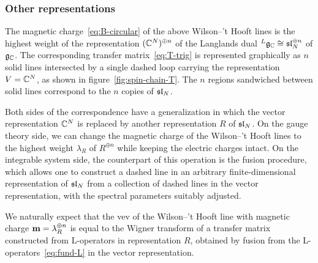 \subsubsection{Other representations}

The magnetic charge~\eqref{eq:B-circular} of the above Wilson--'t
Hooft lines is the highest weight of the representation
$(\mathbb{C}^N)^{\oplus n}$ of the Langlands dual
${}^L\mathfrak{g}_{\mathbb{C}} \cong \mathfrak{sl}_N^{\oplus n}$ of $\mathfrak{g}_{\mathbb{C}}$.  The corresponding
transfer matrix~\eqref{eq:T-trig} is represented graphically as $n$
solid lines intersected by a single dashed loop carrying the
representation $V = \mathbb{C}^N$, as shown in figure~\ref{fig:spin-chain-T}.
The $n$ regions sandwiched between solid lines correspond to the $n$
copies of $\mathfrak{sl}_N$.

Both sides of the correspondence have a generalization in which the
vector representation $\mathbb{C}^N$ is replaced by another representation $R$
of $\mathfrak{sl}_N$.  On the gauge theory side, we can change the magnetic
charge of the Wilson--'t Hooft lines to the highest weight $\lambda_R$
of $R^{\oplus n}$ while keeping the electric charges intact.  On the
integrable system side, the counterpart of this operation is the
fusion procedure, which allows one to construct a dashed line in an
arbitrary finite-dimensional representation of $\mathfrak{sl}_N$ from a
collection of dashed lines in the vector representation, with the
spectral parameters suitably adjusted.

We naturally expect that the vev of the Wilson--'t Hooft line with
magnetic charge $\mathbf{m} = \lambda_R^{\oplus n}$ is equal to the
Wigner transform of a transfer matrix constructed from L-operators in
representation $R$, obtained by fusion from the
L-operators~\eqref{eq:fund-L} in the vector representation.

